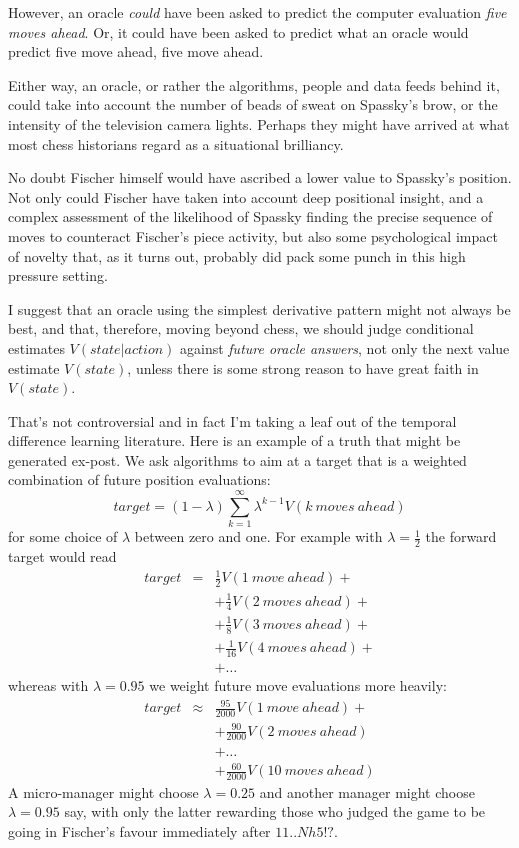 However, an oracle {\em could} have been asked to predict the computer evaluation {\em five moves ahead}. Or, it could have been asked to predict what an oracle would predict five move ahead, five move ahead. 

Either way, an oracle, or rather the algorithms, people and data feeds behind it, could take into account the number of beads of sweat on Spassky's brow, or the intensity of the television camera lights. Perhaps they might have arrived at what most chess historians regard as a situational brilliancy. 

No doubt Fischer himself would have ascribed a lower value to Spassky's position. Not only could Fischer have taken into account deep positional insight, and a complex assessment of the likelihood of Spassky finding the precise sequence of moves to counteract Fischer's piece activity, but also some psychological impact of novelty that, as it turns out, probably did pack some punch in this high pressure setting. 


I suggest that an oracle using the simplest derivative pattern might not always be best, and that, therefore, moving beyond chess, we should judge conditional estimates $V(state|action)$ against {\em future oracle answers}, not only the next value estimate $V(state)$, unless there is some strong reason to have great faith in $V(state)$.

That's not controversial and in fact I'm taking a leaf out of the temporal difference learning literature. Here is an example of a truth that might be generated ex-post. We ask algorithms to aim at a target that is a weighted combination of future position evaluations:
\begin{equation}
\label{eqn:target}
      target = (1-\lambda) \sum_{k=1}^{\infty} \lambda^{k-1} V(k\ moves\ ahead)
\end{equation}
for some choice of $\lambda$ between zero and one. For example with $\lambda=\frac{1}{2}$ the forward target would read 
\begin{eqnarray*}
      target & = & \frac{1}{2} V(1\ move\ ahead) + \\
             & &  + \frac{1}{4} V(2\ moves\ ahead)+ \\ 
                & &  + \frac{1}{8} V(3\ moves\ ahead)+ \\  
            & &  + \frac{1}{16} V(4\ moves\ ahead)+ \\  
            & &  + \dots 
\end{eqnarray*}
whereas with $\lambda=0.95$ we weight future move evaluations more heavily:
\begin{eqnarray*}
      target & \approx & \frac{95}{2000} V(1\ move\ ahead) + \\
             & &  + \frac{90}{2000} V(2\ moves\ ahead) \\ 
            & &  + \dots \\
            & & + \frac{60}{2000} V(10 \ moves\ ahead)
\end{eqnarray*}
A micro-manager might choose $\lambda=0.25$ and another manager might choose $\lambda=0.95$ say, with only the latter rewarding those who judged the game to be going in Fischer's favour immediately after $11..Nh5!?$. 


